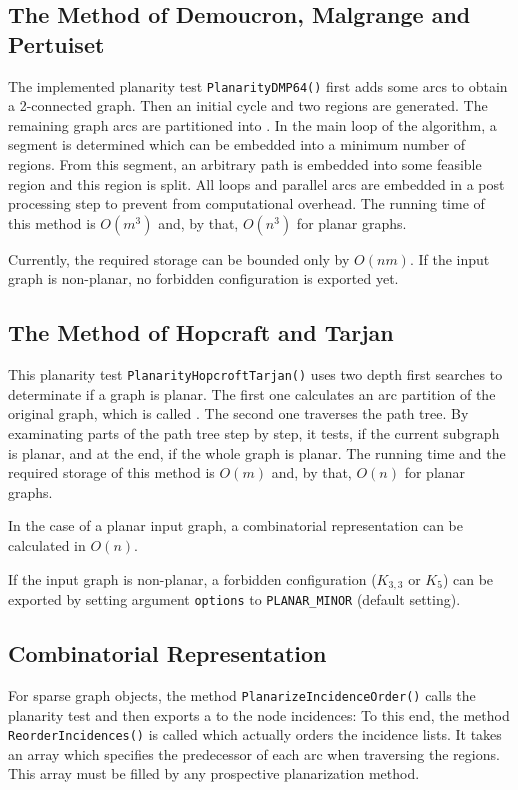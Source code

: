\documentclass[a4paper,11pt,twoside]{book}
\begin{document}
\begin{multicols}{2}
\subsection{The Method of Demoucron, Malgrange and Pertuiset}
The implemented planarity test \verb/PlanarityDMP64()/ first adds some arcs
to obtain a 2-connected graph. Then an initial cycle and two regions are
generated. The remaining graph arcs are partitioned into . In the
main loop of the algorithm, a segment is determined which can be embedded into
a minimum number of regions. From this segment, an arbitrary path is embedded
into some feasible region and this region is split.
All loops and parallel arcs are embedded in a post processing step to prevent
from computational overhead.
The running time of this method is $O(m^3)$ and, by that, $O(n^3)$ for planar
graphs.

Currently, the required storage can be bounded only by $O(nm)$. If the input
graph is non-planar, no forbidden configuration is exported yet.


\subsection{The Method of Hopcraft and Tarjan}
This planarity test \verb/PlanarityHopcroftTarjan()/ uses two depth first
searches to determinate if a graph is planar. The first one calculates an arc
partition of the original graph, which is called . The second one
traverses the path tree. By examinating parts of the path tree step by step,
it tests, if the current subgraph is planar, and at the end, if the whole
graph is planar.
The running time and the required storage of this method is $O(m)$ and, by
that, $O(n)$ for planar graphs.

In the case of a planar input graph, a combinatorial representation can be
calculated in $O(n)$.

If the input graph is non-planar, a forbidden configuration ($K_{3,3}$ or
$K_5$) can be exported by setting argument \verb/options/ to
\verb/PLANAR_MINOR/ (default setting).


\subsection{Combinatorial Representation}
For sparse graph objects, the method \verb/PlanarizeIncidenceOrder()/ calls the
planarity test and then exports a  to the node
incidences: To this end, the method \verb/ReorderIncidences()/
is called which actually orders the incidence lists. It takes an array which
specifies the predecessor of each arc when traversing the regions.
This array must be filled by any prospective planarization method.



\end{multicols}
\end{document}
